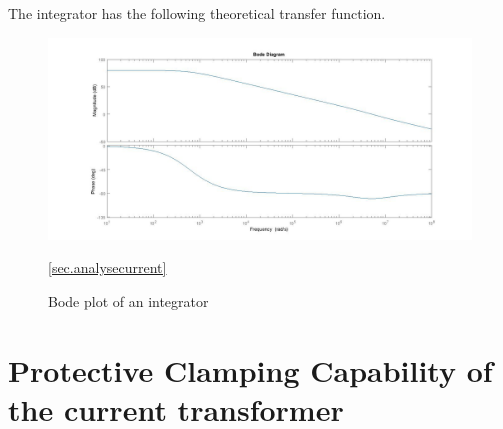 The integrator has the following theoretical transfer function.

\begin{figure}

\includegraphics[width=\textwidth]{figures/Method/integrator/transferfunction_int.jpg}

\caption[Kurze Abbildungsbeschreibung]{Bode plot of an integrator } \ref{sec.analysecurrent}
\end{figure}
	



\section{Protective Clamping Capability of the current transformer}

